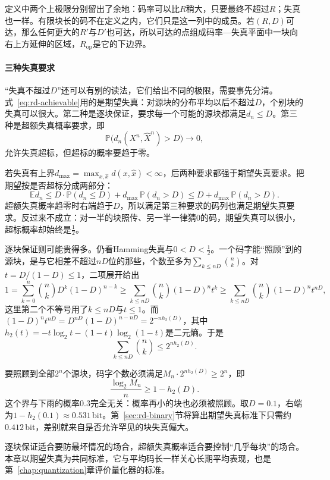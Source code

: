 定义中两个上极限分别留出了余地：码率可以比$R$稍大，只要最终不超过$R$；失真也一样。有限块长的码不在定义之内，它们只是这一列中的成员。若$(R,D)$可达，那么任何更大的$R'$与$D'$也可达，所以可达的点组成码率—失真平面中一块向右上方延伸的区域，$R_{\mathrm{op}}$是它的下边界。

\paragraph{三种失真要求}
“失真不超过$D$”还可以有别的读法，它们给出不同的极限，需要事先分清。式~\eqref{eq:rd-achievable}用的是期望失真：对源块的分布平均以后不超过$D$，个别块的失真可以很大。第二种是逐块保证，要求每一个可能的源块都满足$d_n\leq D$。第三种是超额失真概率要求，即
\[
  \mathbb{P}\bigl(d_n(X^{n},\hat{X}^{n})>D\bigr)\to0 ,
\]
允许失真超标，但超标的概率要趋于零。

若失真有上界$d_{\max}=\max_{x,\hat{x}}d(x,\hat{x})<\infty$，后两种要求都强于期望失真要求。把期望按是否超标分成两部分：
\[
  \mathbb{E}d_n\leq D\cdot\mathbb{P}(d_n\leq D)+d_{\max}\,\mathbb{P}(d_n>D)
  \leq D+d_{\max}\,\mathbb{P}(d_n>D).
\]
超额失真概率趋零时右端趋于$D$，所以满足第三种要求的码列也满足期望失真要求。反过来不成立：对一半的块照传、另一半一律猜$0$的码，期望失真可以很小，超标概率却始终是$\tfrac12$。

逐块保证则可能贵得多。仍看Hamming失真与$0<D<\tfrac12$。一个码字能“照顾”到的源块，是与它相差不超过$nD$位的那些，个数至多为$\sum_{k\leq nD}\binom{n}{k}$。对$t=D/(1-D)\leq1$，二项展开给出
\[
  1=\sum_{k=0}^{n}\binom{n}{k}D^{k}(1-D)^{n-k}
  \geq\sum_{k\leq nD}\binom{n}{k}(1-D)^{n}t^{k}
  \geq\sum_{k\leq nD}\binom{n}{k}(1-D)^{n}t^{nD},
\]
这里第二个不等号用了$k\leq nD$与$t\leq1$。而$(1-D)^{n}t^{nD}=D^{nD}(1-D)^{n-nD}=2^{-nh_2(D)}$，其中$h_2(t)=-t\log_2t-(1-t)\log_2(1-t)$是二元熵。于是
\[
  \sum_{k\leq nD}\binom{n}{k}\leq2^{nh_2(D)} .
\]

要照顾到全部$2^{n}$个源块，码字个数必须满足$M_n\cdot2^{nh_2(D)}\geq2^{n}$，即
\[
  \frac{\log_2M_n}{n}\geq1-h_2(D).
\]
这个界与下雨的概率$0.3$完全无关：概率再小的块也必须被照顾。取$D=0.1$，右端为$1-h_2(0.1)\approx0.531$\,bit。第~\ref{sec:rd-binary}节将算出期望失真标准下只需约$0.412$\,bit，差别就来自是否允许罕见的块失真偏大。

逐块保证适合要防最坏情况的场合，超额失真概率适合要控制“几乎每块”的场合。本章以期望失真为共同标准，它与平均码长一样关心长期平均表现，也是第~\ref{chap:quantization}章评价量化器的标准。
